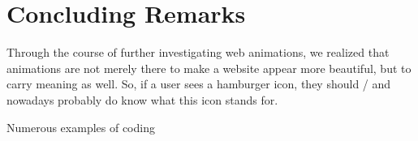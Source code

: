 %
%
% 
% 
% 


\chapter{Concluding Remarks}

\label{chap:Concl}

Through the course of further investigating web animations, we realized that animations are not merely there to make a website appear more beautiful, but to carry meaning as well. So, if a user sees a hamburger icon, they should / and nowadays probably do know what this icon stands for. 

Numerous examples of coding 
